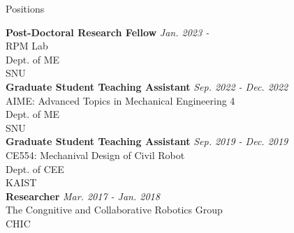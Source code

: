 \begin{rSection}{Positions}

{\bf Post-Doctoral Research Fellow} \hfill {\em Jan. 2023 -} \\
\acf{RPM} Lab \\ 
Dept. of \acf{ME} \\
\acf{SNU}\\

{\bf Graduate Student Teaching Assistant} \hfill {\em Sep. 2022 - Dec. 2022} \\
AIME: Advanced Topics in Mechanical Engineering 4 \\ 
Dept. of \acf{ME} \\
\acf{SNU}\\

{\bf Graduate Student Teaching Assistant} \hfill {\em Sep. 2019 - Dec. 2019} \\
CE554: Mechanival Design of Civil Robot \\ 
Dept. of \acf{CEE} \\
\acf{KAIST}\\

{\bf Researcher} \hfill {\em Mar. 2017 - Jan. 2018} \\
The Congnitive and Collaborative Robotics Group\\
\acf{CHIC}\\


\end{rSection}

